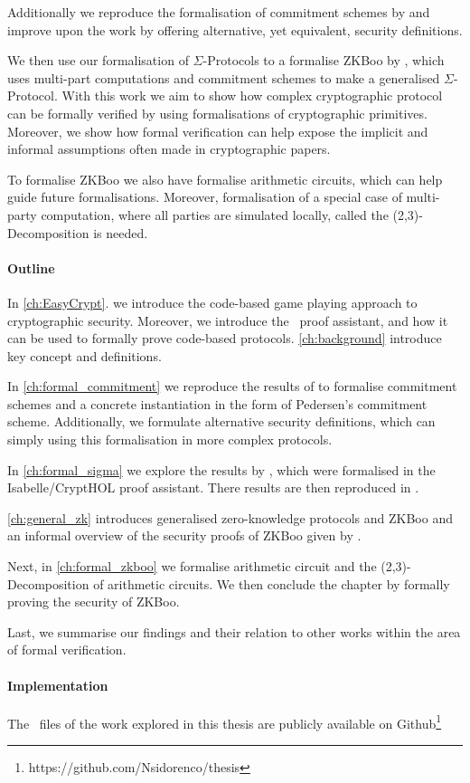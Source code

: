 Additionally we reproduce the formalisation of commitment schemes by
\citet{DBLP:journals/corr/MetereD17} and improve upon the work by offering
alternative, yet equivalent, security definitions.

We then use our formalisation of $\Sigma$-Protocols to a formalise ZKBoo by
\citet{zkboo}, which uses multi-part computations and commitment schemes to make
a generalised $\Sigma$-Protocol. With this work we aim to show how complex
cryptographic protocol can be formally verified by using formalisations of
cryptographic primitives. Moreover, we show how formal verification can help expose
the implicit and informal assumptions often made in cryptographic papers.

To formalise ZKBoo we also have formalise arithmetic circuits, which can help guide
future formalisations. Moreover, formalisation of a special case of multi-party
computation, where all parties are simulated locally, called the
(2,3)-Decomposition is needed.


\paragraph{Outline}
In \autoref{ch:EasyCrypt}. we introduce the code-based game playing approach to
cryptographic security. Moreover, we introduce the \easycrypt\ proof assistant,
and how it can be used to formally prove code-based protocols.
\autoref{ch:background} introduce key concept and definitions.

In \autoref{ch:formal_commitment} we reproduce the results of
\citet{DBLP:journals/corr/MetereD17} to formalise commitment schemes and a
concrete instantiation in the form of Pedersen's commitment scheme.
Additionally, we formulate alternative security definitions, which can simply
using this formalisation in more complex protocols.

In \autoref{ch:formal_sigma} we explore the results by
\citet{cryptoeprint:2019:1185}, which were formalised in the Isabelle/CryptHOL
proof assistant. There results are then reproduced in \easycrypt.

\autoref{ch:general_zk} introduces generalised zero-knowledge protocols and
ZKBoo and an informal overview of the security proofs of ZKBoo given by \citet{zkboo}.

Next, in \autoref{ch:formal_zkboo} we formalise arithmetic circuit and the
(2,3)-Decomposition of arithmetic circuits. We then conclude the chapter by
formally proving the security of ZKBoo.

Last, we summarise our findings and their relation to other works within the
area of formal verification.

\paragraph{Implementation}
The \easycrypt\ files of the work explored in this thesis
are publicly available on Github\footnote{https://github.com/Nsidorenco/thesis}

